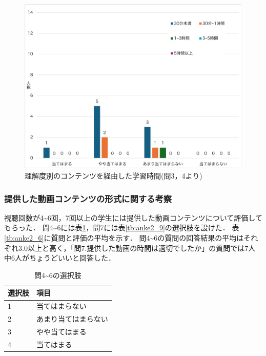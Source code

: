\documentclass[12pt,a4j,titlepage]{ltjsarticle}
\begin{document}
\begin{figure}[!htb]
\centering
    \centering
    \includegraphics[width=1.0\columnwidth]{理解度軸の経由.pdf}
    \caption{理解度別のコンテンツを経由した学習時間(問3，4より)}
    \label{fig:rikai2}
\end{figure}
\clearpage

\subsubsection{提供した動画コンテンツの形式に関する考察}

視聴回数が4\textasciitilde6回，7回以上の学生には提供した動画コンテンツについて評価してもらった．
問4\textasciitilde6には表\ref{tb:anke2_5}，問7には表\ref{tb:anke2_9}の選択肢を設けた．
表\ref{tb:anke2_6}に質問と評価の平均を示す．
問4\textasciitilde6の質問の回答結果の平均はそれぞれ3.0以上と高く，「問7.提供した動画の時間は適切でしたか」の質問では7人中6人がちょうどいいと回答した．

\begin{table}[htbp]
  \caption{問4\textasciitilde6の選択肢}
  \begin{center}
\begin{tabular}{ll}\hline
選択肢 & 項目\\ \hline
               1 & 当てはまらない \\ 
               2 & あまり当てはまらない\\
               3 & やや当てはまる\\
               4 & 当てはまる\\
              \hline
               \end{tabular}
               \end{center}
               \label{tb:anke2_5}
               \end{table}
\end{document}
